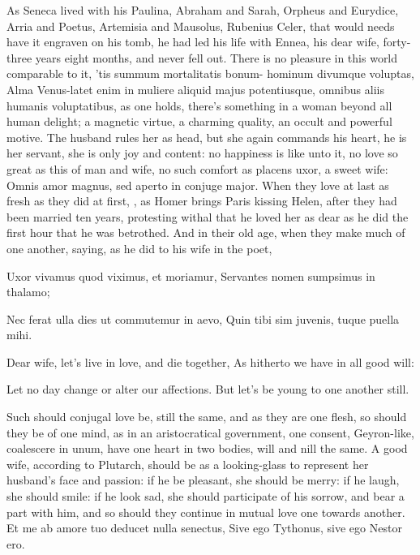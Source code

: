{As Seneca lived with his Paulina, Abraham and Sarah, Orpheus and
Eurydice, Arria and Poetus, Artemisia and Mausolus, Rubenius Celer,
that would needs have it engraven on his tomb, he had led his life with
Ennea, his dear wife, forty-three years eight months, and never fell
out. There is no pleasure in this world comparable to it, 'tis summum
mortalitatis bonum- hominum divumque voluptas, Alma Venus-latet
enim in muliere aliquid majus potentiusque, omnibus aliis humanis
voluptatibus, as one holds, there's something in a woman beyond
all human delight; a magnetic virtue, a charming quality, an occult and
powerful motive. The husband rules her as head, but she again commands
his heart, he is her servant, she is only joy and content: no happiness
is like unto it, no love so great as this of man and wife, no such
comfort as placens uxor, a sweet wife: Omnis amor magnus,
sed aperto in conjuge major. When they love at last as fresh as they
did at first, , as Homer brings
Paris kissing Helen, after they had been married ten years, protesting
withal that he loved her as dear as he did the first hour that he was
betrothed. And in their old age, when they make much of one another,
saying, as he did to his wife in the poet,

Uxor vivamus quod viximus, et moriamur,
Servantes nomen sumpsimus in thalamo;

Nec ferat ulla dies ut commutemur in aevo,
Quin tibi sim juvenis, tuque puella mihi.


Dear wife, let's live in love, and die together,
As hitherto we have in all good will:

Let no day change or alter our affections.
But let's be young to one another still.

Such should conjugal love be, still the same, and as they are one
flesh, so should they be of one mind, as in an aristocratical
government, one consent, Geyron-like, coalescere in unum, have
one heart in two bodies, will and nill the same. A good wife, according
to Plutarch, should be as a looking-glass to represent her husband's
face and passion: if he be pleasant, she should be merry: if he laugh,
she should smile: if he look sad, she should participate of his sorrow,
and bear a part with him, and so should they continue in mutual love
one towards another.
Et me ab amore tuo deducet nulla senectus,
Sive ego Tythonus, sive ego Nestor ero.

}
